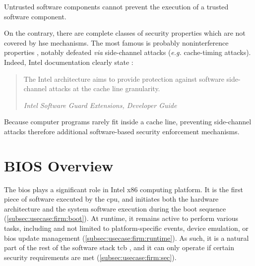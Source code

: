 \begin{definition}[Availability]
Untrusted software components cannot prevent the execution of a trusted
  software component.
\end{definition}

On the contrary, there are complete classes of security properties which are not
covered by \ac{hse} mechanisms. 
%
The most famous is probably noninterference properties , notably defeated
\emph{via} side-channel attacks (\emph{e.g.} cache-timing attacks). Indeed,
Intel documentation clearly state :

\begin{quote}
  The Intel architecture aims to provide protection against software
  side-channel attacks at the cache line granularity.

  \hfill\small \emph{Intel Software Guard Extensions, Developer Guide}
\end{quote}

Because computer programs rarely fit inside a cache line, preventing
side-channel attacks therefore additional software-based security enforcement
mechanisms. 

\section{BIOS Overview}
\label{sec:usecase:firmware}

The \ac{bios} plays a significant role in Intel x86 computing platform.
%
It is the first piece of software executed by the \ac{cpu}, and initiates both
the hardware architecture and the system software execution during the boot
sequence (\ref{subsec:usecase:firm:boot}).
%
At runtime, it remains active to perform various tasks, including and not
limited to platform-specific events, device emulation, or \ac{bios} update
management (\ref{subsec:usecase:firm:runtime}).
%
As such, it is a natural part of the rest of the software stack \ac{tcb} , and it
can only operate if certain security requirements are met
(\ref{subsec:usecase:firm:sec}).

